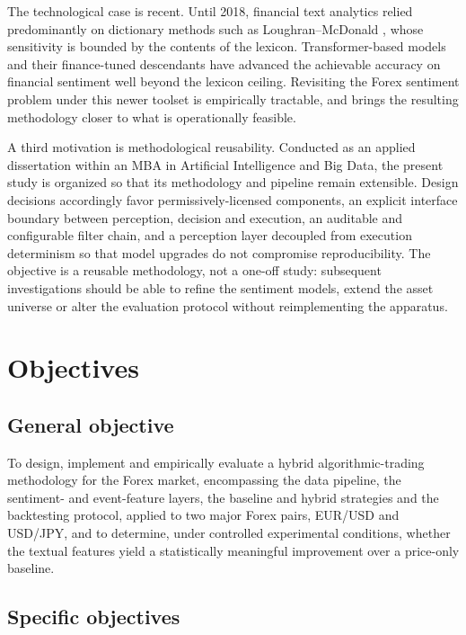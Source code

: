 The technological case is recent. Until 2018, financial text analytics relied predominantly on dictionary methods such as Loughran--McDonald \cite{loughran2011liability}, whose sensitivity is bounded by the contents of the lexicon. Transformer-based models \cite{vaswani2017attention,devlin2019bert} and their finance-tuned descendants \cite{araci2019finbert,yang2020finbert,wu2023bloomberggpt,liu2023fingpt} have advanced the achievable accuracy on financial sentiment well beyond the lexicon ceiling. Revisiting the Forex sentiment problem under this newer toolset is empirically tractable, and brings the resulting methodology closer to what is operationally feasible.

A third motivation is methodological reusability. Conducted as an applied dissertation within an MBA in Artificial Intelligence and Big Data, the present study is organized so that its methodology and pipeline remain extensible. Design decisions accordingly favor permissively-licensed components, an explicit interface boundary between perception, decision and execution, an auditable and configurable filter chain, and a perception layer decoupled from execution determinism so that model upgrades do not compromise reproducibility. The objective is a reusable methodology, not a one-off study: subsequent investigations should be able to refine the sentiment models, extend the asset universe or alter the evaluation protocol without reimplementing the apparatus.

\section{Objectives} \label{sec:objectives}

\subsection{General objective}

To design, implement and empirically evaluate a hybrid algorithmic-trading methodology for the Forex market, encompassing the data pipeline, the sentiment- and event-feature layers, the baseline and hybrid strategies and the backtesting protocol, applied to two major Forex pairs, EUR/USD and USD/JPY, and to determine, under controlled experimental conditions, whether the textual features yield a statistically meaningful improvement over a price-only baseline.

\subsection{Specific objectives}

